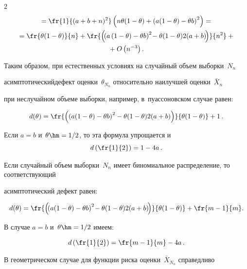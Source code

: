 \begin{multicols}{2}
\begin{multline*}
{}=


\fr{1}{(a + b + n)^2} \left(n\theta(1 - \theta) + \left(a(1 -


\theta) - \theta b\right)^2\right) ={}


\\


{}= \fr{\theta(1 - \theta)}{n} + \fr{\left(\! \left(a\left(1 - \theta\right) - 


\theta b\right)^2\! -\theta(1 - \theta)2(a + b)\!\right)}{n^2} + {}\\


{}+ O\left(n^{-3}\right).


\end{multline*}


Таким образом, при естественных условиях на случайный объем выборки~$N_n$ 


асимптотический\linebreak дефект оценки~$\theta_{N_n}$ относительно наилучшей оценки~$\bar X_n$ 


при неслучайном объеме выборки, например, в~пуассоновском случае равен:


$$


d(\theta) = \fr{\left( \left(a(1 - \theta) - \theta b\right)^2 -


\theta(1 - \theta)2(a + b)\right)}{\theta(1 - \theta)} + 1\,.


$$


Если $a = b$ и~$\theta\hm = 1/2$, то эта формула упрощается и~$$


d\left(\fr{1}{2}\right) = 1 - 4a\,.


$$


Если случайный объем выборки~$N_n$ имеет биномиальное распределение, то соответствующий 


асимп\-то\-ти\-че\-ский дефект равен:


$$


d(\theta) = \fr{\left( \!\left(a(1 - \theta) - \theta b\right)^2\! -


\theta(1 - \theta)2(a + b)\!\right)}{\theta(1 - \theta)} + \fr{m - 1}{m}.\hspace*{-0.83063pt}


$$


В случае $a = b$ и~$\theta\hm = 1/2$ имеем:


$$


d\left(\fr{1}{2}\right) = \fr{m - 1}{m} - 4a\,.


$$


В геометрическом случае для функции риска оценки~$\bar X_{N_n}$ справедливо 



\end{multicols}
